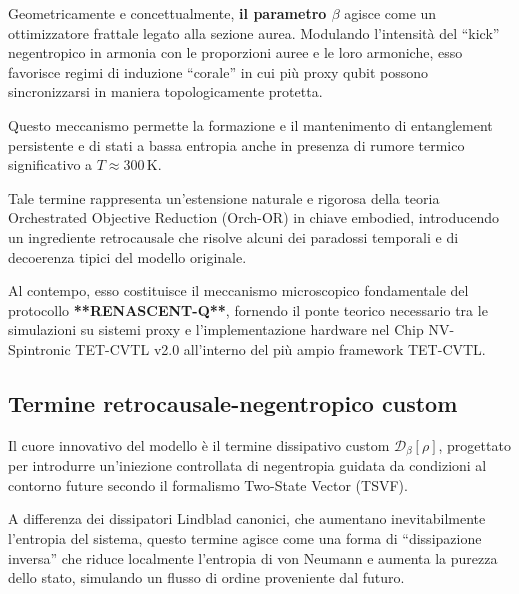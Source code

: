 \documentclass[11pt,a4paper]{article}
\theoremstyle{plain}
\theoremstyle{definition}
\begin{document}
\vspace{0.2cm}

Geometricamente e concettualmente, \textbf{il parametro $\beta$} agisce come un ottimizzatore frattale legato alla sezione aurea. Modulando l'intensità del ``kick'' negentropico in armonia con le proporzioni auree e le loro armoniche, esso favorisce regimi di induzione ``corale'' in cui più proxy qubit possono sincronizzarsi in maniera topologicamente protetta. 


\vspace{0.2cm}

Questo meccanismo permette la formazione e il mantenimento di entanglement persistente e di stati a bassa entropia anche in presenza di rumore termico significativo a $T \approx 300\,\text{K}$.

\vspace{0.2cm}

Tale termine rappresenta un'estensione naturale e rigorosa della teoria Orchestrated Objective Reduction (Orch-OR) in chiave embodied, introducendo un ingrediente retrocausale che risolve alcuni dei paradossi temporali e di decoerenza tipici del modello originale. 


\vspace{0.3cm}


Al contempo, esso costituisce il meccanismo microscopico fondamentale del protocollo \textbf{**RENASCENT-Q**}, fornendo il ponte teorico necessario tra le simulazioni su sistemi proxy e l'implementazione hardware nel Chip NV-Spintronic TET-CVTL v2.0 all'interno del più ampio framework TET-CVTL.


\vspace{0.4cm}


\subsection{Termine retrocausale-negentropico custom}
\label{subsec:d_beta}

\vspace{0.2cm}

Il cuore innovativo del modello è il termine dissipativo custom $\mathcal{D}_\beta[\rho]$, progettato per introdurre un’iniezione controllata di negentropia guidata da condizioni al contorno future secondo il formalismo Two-State Vector (TSVF). 



\vspace{0.2cm}


A differenza dei dissipatori Lindblad canonici, che aumentano inevitabilmente l’entropia del sistema, questo termine agisce come una forma di ``dissipazione inversa'' che riduce localmente l’entropia di von Neumann e aumenta la purezza dello stato, simulando un flusso di ordine proveniente dal futuro.
\end{document}
